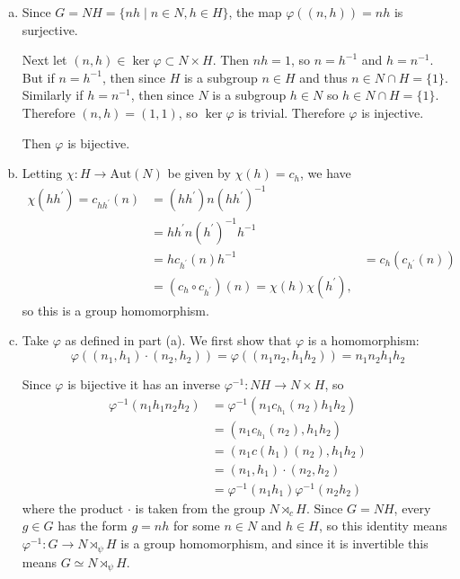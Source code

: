 \documentclass{article}
\begin{document}
\begin{Answer}
\begin{enumerate}[(a)]
  \item{Since $G = NH = \{ nh \mid n \in N, h \in H \}$, 
        the map $\varphi((n, h)) = nh$ is surjective.

        Next let $(n, h) \in \ker \varphi \subset N \times H$. Then 
        $nh = 1$, so $n = h^{-1}$ and $h = n^{-1}$. But if
        $n = h^{-1}$, then since $H$ is a subgroup $n \in H$
        and thus $n \in N \cap H = \{1\}$. 
        Similarly if $h = n^{-1}$, then
        since $N$ is a subgroup $h \in N$ so $h \in N \cap H = \{1\}$.
        Therefore $(n, h) = (1, 1)$, so $\ker \varphi$ is trivial.
        Therefore $\varphi$ is injective.

        Then $\varphi$ is bijective.
       }
  \item{
    Letting $\chi : H \to \mathrm{Aut}(N)$ be given by
    $\chi(h) = c_h$, we have
    \begin{align*}
     \chi(h h^\prime) =  c_{h h^\prime}(n)
  &= (h h^\prime) n (h h^\prime)^{-1} \\
  &= h h^\prime n (h^\prime)^{-1} h^{-1} \\
  &= h c_{h^\prime}(n) h^{-1}
  &= c_h (c_{h^\prime} (n)) \\
  &= (c_h \circ c_{h^\prime})(n) = \chi(h) \chi(h^\prime),
    \end{align*}
    so this is a group homomorphism.
  }
  \item{
    Take $\varphi$ as defined in part (a). We first show that
    $\varphi$ is a homomorphism:
    $$
    \varphi((n_1, h_1) \cdot (n_2, h_2))
  = \varphi((n_1 n_2, h_1 h_2))
  = n_1 n_2 h_1 h_2
    $$
    
    Since $\varphi$ is
    bijective it has an inverse $\varphi^{-1} : NH \to N \times H$, so
    \begin{align*}
    \varphi^{-1}(n_1 h_1 n_2 h_2)
 &= \varphi^{-1}(n_1 c_{h_1}(n_2) h_1 h_2) \\
 &= (n_1 c_{h_1}(n_2), h_1 h_2) \\
 &= (n_1 c(h_1)(n_2), h_1 h_2) \\
 &= (n_1, h_1) \cdot (n_2, h_2) \\
 &= \varphi^{-1}(n_1 h_1) \varphi^{-1}(n_2 h_2)
    \end{align*}
    where the product 
    $\cdot$ is taken from the group $N \rtimes_c H$. Since $G = NH$,
    every $g \in G$ has the form $g = nh$ for some $n \in N$ and $h
    \in H$, so this identity means 
    $\varphi^{-1} : G \to N \rtimes_{\psi} H$ is a group
    homomorphism, and since it is invertible this means
    $G \simeq N \rtimes_{\psi} H$.
  }
\end{enumerate}
\end{Answer}
\end{document}
